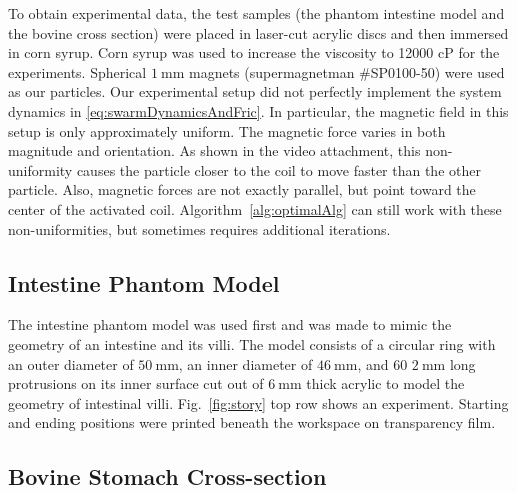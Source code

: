 To obtain experimental data, the test samples (the phantom intestine model and the bovine cross section) were placed in laser-cut acrylic discs and then immersed in corn syrup. Corn syrup was used to increase the viscosity to 12000 cP for the experiments. Spherical $\SI{1}{\milli\metre}$ magnets (supermagnetman \#SP0100-50) were used as our particles. Our experimental setup did not perfectly implement the system dynamics in \eqref{eq:swarmDynamicsAndFric}. In particular, the magnetic field in this setup is only approximately uniform. The magnetic force varies in both magnitude and orientation. As shown in the video attachment, this non-uniformity causes the particle closer to the coil to move faster than the other particle. Also, magnetic forces are not exactly parallel, but point toward the center of the activated coil. Algorithm~\ref{alg:optimalAlg} can still work with  these non-uniformities, but sometimes requires additional iterations.
 


\subsection{Intestine Phantom Model}

The intestine phantom model was used first and was made to mimic the geometry of an intestine and its villi. The model consists of a circular ring with an outer diameter of $\SI{50}{\milli\metre}$, an inner diameter of $\SI{46}{\milli\metre}$, and 60 $\SI{2}{\milli\metre}$ long protrusions on its inner surface cut out of $\SI{6}{\milli\metre}$ thick acrylic to model the geometry of intestinal villi. Fig.~\ref{fig:story} top row shows an experiment. Starting and ending positions were printed beneath the workspace on transparency film. 





\subsection{Bovine Stomach Cross-section}

